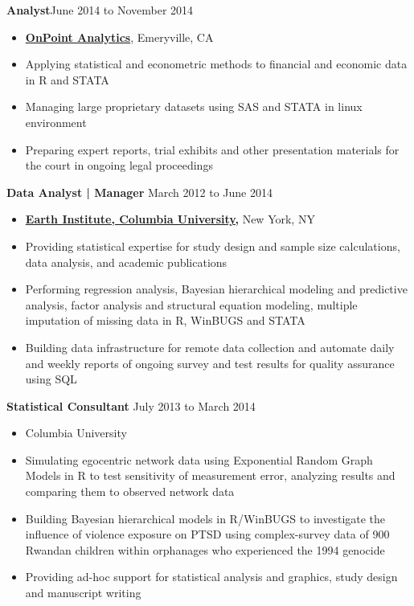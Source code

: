 \documentclass[11pt]{article}
\newenvironment{innerlist}[1][\enskip\textbullet]%
        {\begin{itemize}[#1,leftmargin=*,parsep=0pt,itemsep=0pt,topsep=0pt,partopsep=0pt]}
        {\end{itemize}}
\begin{document}
\textbf{Analyst}\hfill{June 2014 to November 2014}
\begin{innerlist}
\item[] \href{http://www.onpointanalytics.com}{\textbf{OnPoint Analytics}}, Emeryville, CA\\
\item Applying statistical and econometric methods to financial and economic data in R and STATA
\item Managing large proprietary datasets using SAS and STATA in linux environment
\item Preparing expert reports, trial exhibits and other presentation materials for the court in ongoing legal proceedings\\

\end{innerlist}

\textbf{Data Analyst | Manager} \hfill {March 2012 to June 2014}
\begin{innerlist}
\item[] \href{http://www.ei.columbia.edu}{\textbf{Earth Institute, Columbia University,}} New York, NY\\
\item Providing statistical expertise for study design and sample size calculations, data analysis, and academic publications
\item Performing regression analysis, Bayesian hierarchical modeling and predictive analysis, factor analysis and structural equation modeling, multiple imputation of missing data in R, WinBUGS and STATA
\item Building data infrastructure for remote data collection and automate daily and weekly reports of ongoing survey and test results for quality assurance using SQL\\
\end{innerlist}

\textbf{Statistical Consultant} \hfill {July 2013 to March 2014}
\begin{innerlist}
\item[] Columbia University\\
\item Simulating egocentric network data using Exponential Random Graph Models in R to test sensitivity of measurement error, analyzing results and comparing them to observed network data
\item Building Bayesian hierarchical models in R/WinBUGS to investigate the influence of violence exposure on
PTSD using complex-survey data of 900 Rwandan children within orphanages who experienced the 1994 genocide
\item Providing ad-hoc support for statistical analysis and graphics, study design and manuscript writing\\
\end{innerlist}
\end{document}
